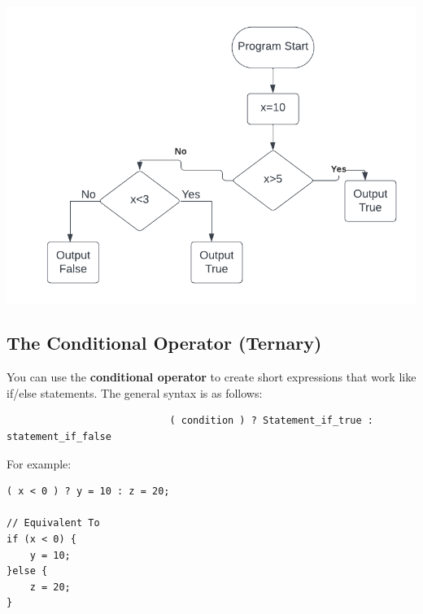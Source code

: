 \documentclass{report}
\begin{document}
    \begin{minipage}[]{0.3\textwidth}
        \begin{center}
            \includegraphics[scale=0.5]{./figures/flowchart3.png}
        \end{center} 
    \end{minipage}


    \bigbreak \noindent 
    \subsection{The Conditional Operator (Ternary)} 
    \bigbreak \noindent 
    \begin{concept}
 You can use the \textbf{conditional operator} to create short expressions that work like if/else statements. The general syntax is as follows:
	\end{concept}
    \smallbreak \noindent
    \sepline
    \begin{verbatim}
                            ( condition ) ? Statement_if_true :  statement_if_false
    \end{verbatim}
    \sepline
    \bigbreak \noindent 
    For example:
    \smallbreak \noindent
    \sepline
    \begin{verbatim}
( x < 0 ) ? y = 10 : z = 20;  

// Equivalent To
if (x < 0) {
    y = 10;
}else {
    z = 20;
}
    \end{verbatim}
    \sepline

    \pagebreak \bigbreak \noindent 
\end{document}
